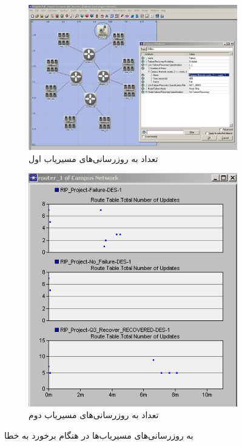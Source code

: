 \documentclass[a4paper]{article}
\begin{document}
\begin{enumerate}
    \begin{figure}[h!]
        \centering
        \begin{subfigure}{0.45\textwidth}
            \centering
            \includegraphics[width=\textwidth]{./figs/q3_recover_cfg.png}
            \caption{تعداد به روزرسانی‌های مسیریاب اول}
        \end{subfigure}
        \hfill
        \begin{subfigure}{0.45\textwidth}
            \centering
            \includegraphics[width=\textwidth]{./figs/comparison_q3_nf_f.png}
            \caption{تعداد به روزرسانی‌های مسیریاب دوم}
        \end{subfigure}
        \caption{به روزرسانی‌های مسیریاب‌ها در هنگام برخورد به خطا}
    \end{figure}


\end{enumerate}
\end{document}
